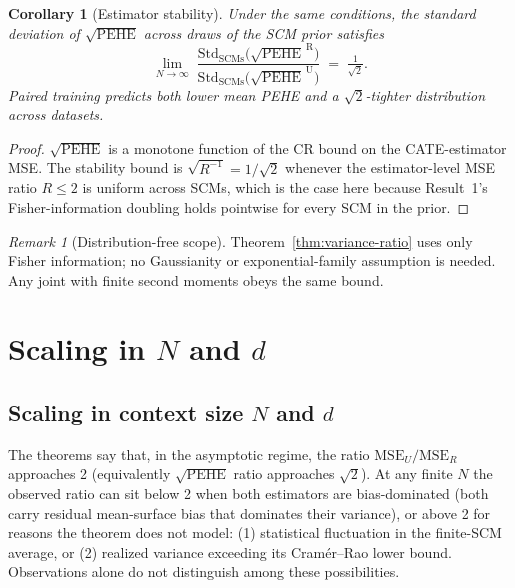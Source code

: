 \documentclass[11pt]{article}
\newtheorem{corollary}[theorem]{Corollary}
\theoremstyle{remark}
\newtheorem{remark}[theorem]{Remark}
\begin{document}
\begin{corollary}[Estimator stability]
\label{cor:stability}
Under the same conditions, the standard deviation of
$\sqrt{\mathrm{PEHE}}$ across draws of the SCM prior satisfies
\begin{equation}
  \lim_{N \to \infty}\;
  \frac{\mathrm{Std}_{\text{SCMs}}\!\bigl(\sqrt{\mathrm{PEHE}}^{\,\mathrm{R}}\bigr)}
       {\mathrm{Std}_{\text{SCMs}}\!\bigl(\sqrt{\mathrm{PEHE}}^{\,\mathrm{U}}\bigr)}
  \;=\; \tfrac{1}{\sqrt{2}}.
\end{equation}
Paired training predicts both lower mean PEHE and a
$\sqrt{2}$-tighter distribution across datasets.
\end{corollary}

\begin{proof}
$\sqrt{\mathrm{PEHE}}$ is a monotone function of the CR bound on the
CATE-estimator MSE. The stability bound is $\sqrt{R^{-1}} = 1/\sqrt{2}$
whenever the estimator-level MSE ratio $R \leq 2$ is uniform across
SCMs, which is the case here because Result~1's Fisher-information
doubling holds pointwise for every SCM in the prior.
\end{proof}

\begin{remark}[Distribution-free scope]
Theorem~\ref{thm:variance-ratio} uses only Fisher information;
no Gaussianity or exponential-family assumption is needed. Any joint
with finite second moments obeys the same bound.
\end{remark}

\section{Scaling in $N$ and $d$}
\label{sec:scaling}

\subsection{Scaling in context size $N$ and $d$}

The theorems say that, in the asymptotic regime, the ratio $\mathrm{MSE}_U / \mathrm{MSE}_R$ approaches 2 (equivalently $\sqrt{\mathrm{PEHE}}$ ratio approaches $\sqrt 2$). At any finite $N$ the observed ratio can sit below 2 when both estimators are bias-dominated (both carry residual mean-surface bias that dominates their variance), or above 2 for reasons the theorem does not model: (1) statistical fluctuation in the finite-SCM average, or (2) realized variance exceeding its Cramér–Rao lower bound. Observations alone do not distinguish among these possibilities.
\end{document}
